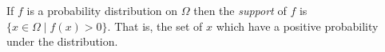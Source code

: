 \documentclass[12pt]{article}
\begin{document}
If $f$ is a probability distribution on $\Omega$ then the \emph{support} of $f$ is $\{x\in \Omega\mid f(x)>0\}$.  That is, the set of $x$ which have a positive probability under the distribution.
\end{document}
